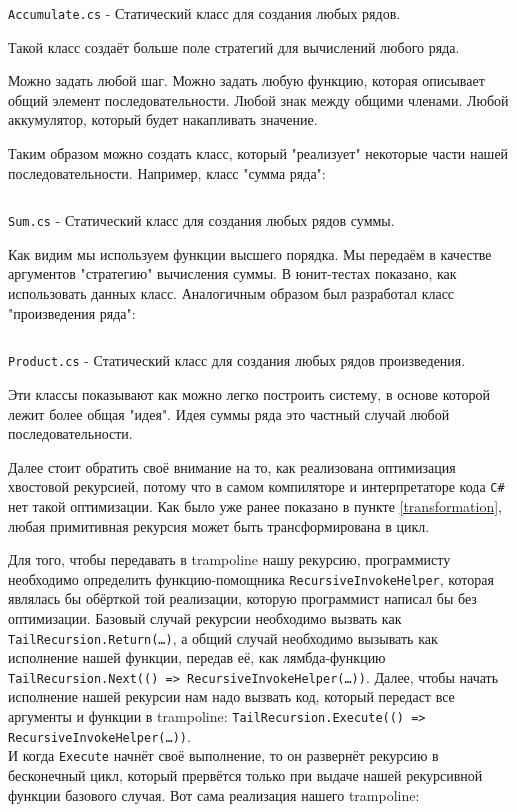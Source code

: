 \begin{code}
	\inputminted[tabsize=2,breaklines]{csharp}{src/Library/Accumulate.cs}
	\caption{\texttt{Accumulate.cs} - Статический класс для создания любых рядов.}
\end{code}

Такой класс создаёт больше поле стратегий для вычислений любого ряда.

Можно задать любой шаг. Можно задать любую функцию, которая описывает общий элемент последовательности. Любой знак между общими членами. Любой аккумулятор, который будет накапливать значение.

Таким образом можно создать класс, который "реализует" некоторые части нашей последовательности. Например, класс "сумма ряда":

\begin{code}
	\inputminted[tabsize=2,breaklines]{csharp}{src/Library/Sum.cs}
	\caption{\texttt{Sum.cs} - Статический класс для создания любых рядов суммы.}
\end{code}

Как видим мы используем функции высшего порядка. Мы передаём в качестве аргументов "стратегию" вычисления суммы.
В юнит-тестах показано, как использовать данных класс.
Аналогичным образом был разработал класс "произведения ряда":

\begin{code}
	\inputminted[tabsize=2,breaklines]{csharp}{src/Library/Product.cs}
	\caption{\texttt{Product.cs} - Статический класс для создания любых рядов произведения.}
\end{code}

Эти классы показывают как можно легко построить систему, в основе которой лежит более общая "идея".
Идея суммы ряда это частный случай любой последовательности.

Далее стоит обратить своё внимание на то, как реализована оптимизация хвостовой рекурсией, потому что в самом компиляторе и интерпретаторе кода \texttt{C\#} нет такой оптимизации.
Как было уже ранее показано в пункте \ref{transformation}, любая примитивная рекурсия может быть трансформирована в цикл.

Для того, чтобы передавать в trampoline нашу рекурсию, программисту необходимо определить функцию-помощника \texttt{RecursiveInvokeHelper}, которая являлась бы обёрткой той реализации, которую программист написал бы без оптимизации. 
Базовый случай рекурсии необходимо вызвать как \texttt{TailRecursion.Return(\dots)}, а общий случай необходимо вызывать как исполнение нашей функции, передав её, как лямбда-функцию \\ \texttt{TailRecursion.Next(() => RecursiveInvokeHelper(\dots))}. 
Далее, чтобы начать исполнение нашей рекурсии нам надо вызвать код, который передаст все аргументы и функции в trampoline: \texttt{TailRecursion.Execute(() => RecursiveInvokeHelper(\dots))}. \\ И когда \texttt{Execute} начнёт своё выполнение, то он развернёт рекурсию в бесконечный цикл, который прервётся только при выдаче нашей рекурсивной функции базового случая. 
Вот сама реализация нашего trampoline:

